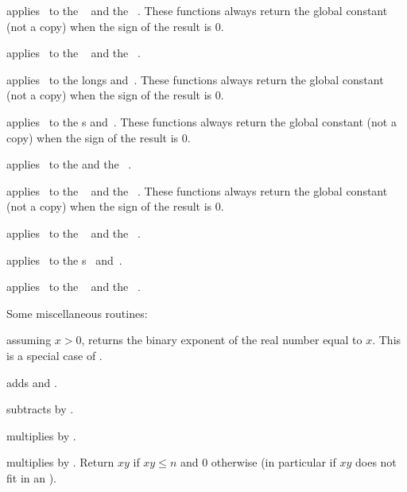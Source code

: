  applies \op\ to the
~ and the ~.
 These functions always return the global constant
 (not a copy) when the sign of the result is $0$.

 applies \op\ to the
~ and the ~.

 applies \op\ to the longs
 and~. These functions always return the global constant
 (not a copy) when the sign of the result is $0$.

 applies \op\ to the
s  and~. These functions always return the global
constant  (not a copy) when the sign of the result is $0$.

 applies \op\ to the
  and the ~.

 applies \op\ to the
~ and the ~. These functions always return
the global constant  (not a copy) when the sign of the result
is $0$.

 applies \op\ to the
~ and the ~.

 applies \op\ to the
s~ and~.

 applies \op\ to the
~ and the ~.

\noindent Some miscellaneous routines:

 assuming $x > 0$, returns the binary exponent of
the real number equal to $x$. This is a special case of .



 adds  and .



 subtracts  by .

 multiplies  by .

 multiplies  by .
Return $xy$ if $xy \leq n$ and $0$ otherwise (in particular if $xy$ does not
fit in an ).

